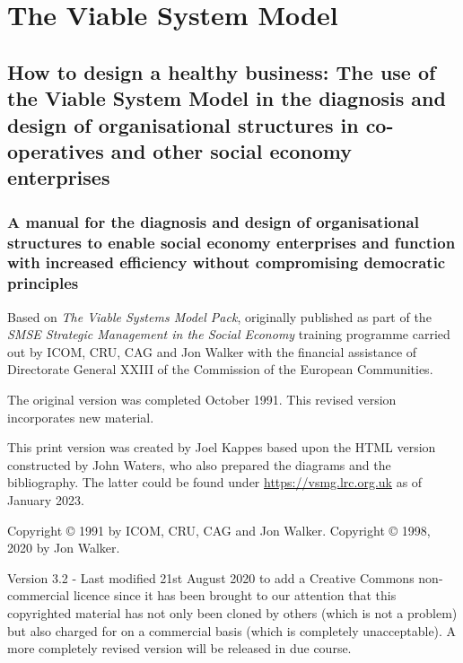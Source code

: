 \chapter*{The Viable System Model}
\section*{How to design a healthy business: The use of the Viable System Model in the diagnosis and design of organisational structures in co-operatives and other social economy enterprises}
\subsection*{A manual for the diagnosis and design of organisational structures to enable social economy enterprises and function with increased efficiency without compromising democratic principles}

{\footnotesize Based on \textit{The Viable Systems Model Pack}, originally published as part of the \textit{SMSE Strategic Management in the Social Economy} training programme
carried out by ICOM, CRU, CAG and Jon Walker with the financial assistance of Directorate General XXIII of the Commission of the European Communities.

The original version was completed October 1991. This  revised version incorporates new material.

This print version was created by Joel Kappes based upon the HTML version constructed by John Waters, who also prepared the diagrams and the bibliography. The latter could be found under \href{https://vsmg.lrc.org.uk}{https://vsmg.lrc.org.uk} as of January 2023.

Copyright © 1991 by ICOM, CRU, CAG and Jon Walker. Copyright © 1998, 2020 by Jon Walker.

Version 3.2 - Last modified 21st August 2020 to add a Creative Commons non-commercial licence since it has been brought to our attention that this copyrighted material has not only been cloned by others (which is not a problem) but also charged for on a commercial basis (which is completely unacceptable). A more completely revised version will be released in due course. }